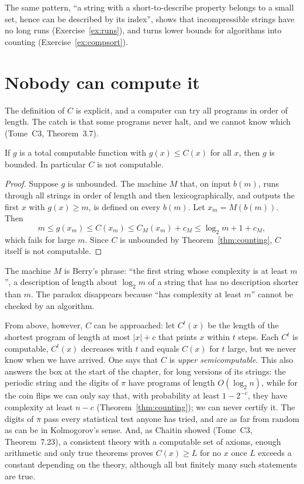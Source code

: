 The same pattern, ``a string with a short-to-describe property belongs to a small set, hence can be described by its index'', shows that incompressible strings have no long runs (Exercise~\ref{ex:runs}), and turns lower bounds for algorithms into counting (Exercise~\ref{ex:compsort}).

\section{Nobody can compute it}\label{sec:noncomputable}

The definition of $C$ is explicit, and a computer can try all programs in order of length. The catch is that some programs never halt, and we cannot know which (Tome~C3, Theorem~3.7).

\begin{theorem}\label{thm:noncomputable}
If $g$ is a total computable function with $g(x)\le C(x)$ for all $x$, then $g$ is bounded. In particular $C$ is not computable.
\end{theorem}

\begin{proof}
Suppose $g$ is unbounded. The machine $M$ that, on input $b(m)$, runs through all strings in order of length and then lexicographically, and outputs the first $x$ with $g(x)\ge m$, is defined on every $b(m)$. Let $x_m=M(b(m))$. Then
\[
m\le g(x_m)\le C(x_m)\le C_M(x_m)+c_M\le\log_2m+1+c_M,
\]
which fails for large $m$. Since $C$ is unbounded by Theorem~\ref{thm:counting}, $C$ itself is not computable.
\end{proof}

The machine $M$ is Berry's phrase: ``the first string whose complexity is at least $m$'', a description of length about $\log_2m$ of a string that has no description shorter than $m$. The paradox disappears because ``has complexity at least $m$'' cannot be checked by an algorithm.

From above, however, $C$ can be approached: let $C^t(x)$ be the length of the shortest program of length at most $|x|+c$ that prints $x$ within $t$ steps. Each $C^t$ is computable, $C^t(x)$ decreases with $t$ and equals $C(x)$ for $t$ large, but we never know when we have arrived. One says that $C$ is \emph{upper semicomputable}. This also answers the box at the start of the chapter, for long versions of its strings: the periodic string and the digits of $\pi$ have programs of length $O(\log_2n)$, while for the coin flips we can only say that, with probability at least $1-2^{-c}$, they have complexity at least $n-c$ (Theorem~\ref{thm:counting}); we can never certify it. The digits of $\pi$ pass every statistical test anyone has tried, and are as far from random as can be in Kolmogorov's sense. And, as Chaitin showed (Tome~C3, Theorem~7.23), a consistent theory with a computable set of axioms, enough arithmetic and only true theorems proves $C(x)\ge L$ for no $x$ once $L$ exceeds a constant depending on the theory, although all but finitely many such statements are true.

